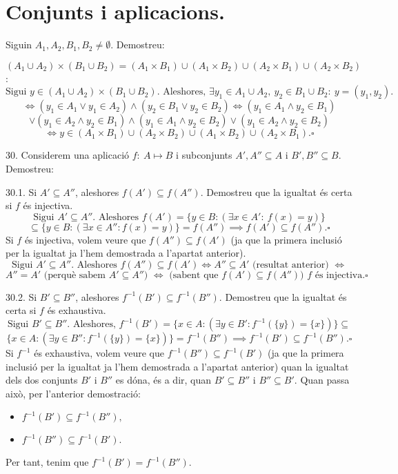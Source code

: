 \documentclass[11pt]{article}
\begin{document}
\section{Conjunts i aplicacions.}
\begin{legal}[start=21]
	\item Siguin $A_1,A_2,B_1,B_2\neq\emptyset$. Demostreu:
	\begin{legal}[start=3]
		\item $(A_1\cup A_2)\times (B_1\cup B_2)=(A_1\times B_1)\cup (A_1\times B_2)\cup (A_2\times B_1)\cup (A_2\times B_2)$:
		$$\textrm{Sigui }y\in (A_1\cup A_2)\times (B_1\cup B_2).\textrm{ Aleshores, }\exists y_1\in A_1\cup A_2, \ y_2\in B_1\cup B_2: \ y=(y_1,y_2).$$
		$$\iff (y_1\in A_1 \vee y_1\in A_2)\wedge (y_2\in B_1 \vee y_2\in B_2)\iff (y_1\in A_1\wedge y_2\in B_1)$$
		$$\vee (y_1\in A_2 \wedge y_2\in B_1)\wedge (y_1\in A_1\wedge y_2\in B_2)\vee (y_1\in A_2\wedge y_2\in B_2)$$
		$$\iff y\in (A_1\times B_1)\cup (A_2\times B_2)\cup (A_1\times B_2)\cup (A_2\times B_1).\square$$
	\end{legal}
	\item[30.] Considerem una aplicació $f: \ A\mapsto B$ i subconjunts $A',A''\subseteq A$ i $B',B''\subseteq B$. Demostreu:
	\begin{legal}
		\item[30.1.] Si $A'\subseteq A''$, aleshores $f(A')\subseteq f(A'')$. Demostreu que la igualtat és certa si $f$ és injectiva.
		$$\textrm{Sigui }A'\subseteq A''.\textrm{ Aleshores }f(A')=\{y\in B:(\exists x\in A':\ f(x)=y)\}$$
		$$\subseteq \{y\in B:(\exists x\in A'':f(x)=y)\}=f(A'')\implies f(A')\subseteq f(A'').\square$$
		Si $f$ és injectiva, volem veure que $f(A'')\subseteq f(A')$ (ja que la primera inclusió per la igualtat ja l'hem demostrada a l'apartat anterior).
		$$\textrm{Sigui }A'\subseteq A''.\textrm{ Aleshores }f(A'')\subseteq f(A') \iff A''\subseteq A'\textrm{ (resultat anterior) }\iff$$
		$$A''=A'\textrm{ (perquè sabem }A'\subseteq A''\textrm{) }\iff\textrm{ (sabent que }f(A')\subseteq f(A'')\textrm{) }f\textrm{ és injectiva.}\square$$
		\item[30.2.] Si $B'\subseteq B''$, aleshores $f^{-1}(B')\subseteq f^{-1}(B'')$. Demostreu que la igualtat és certa si $f$ és exhaustiva.
		$$\textrm{Sigui }B'\subseteq B''.\textrm{ Aleshores, }f^{-1}(B')=\{x\in A:(\exists y\in B':f^{-1}(\{y\})=\{x\})\}\subseteq$$
		$$\{x\in A:(\exists y\in B'':f^{-1}(\{y\})=\{x\})\}=f^{-1}(B'')\implies f^{-1}(B')\subseteq f^{-1}(B'').\square$$
		Si $f^{-1}$ és exhaustiva, volem veure que $f^{-1}(B'')\subseteq f^{-1}(B')$ (ja que la primera inclusió per la igualtat ja l'hem demostrada a l'apartat anterior) quan la igualtat dels dos conjunts $B'$ i $B''$ es dóna, és a dir, quan $B'\subseteq B''$ i $B''\subseteq B'$. Quan passa això, per l'anterior demostració:
		\begin{itemize}
			\item $f^{-1}(B')\subseteq f^{-1}(B''),$
			\item $f^{-1}(B'')\subseteq f^{-1}(B').$
		\end{itemize}
		Per tant, tenim que $f^{-1}(B')=f^{-1}(B'')$.
		

\end{legal}
\end{legal}
\end{document}
